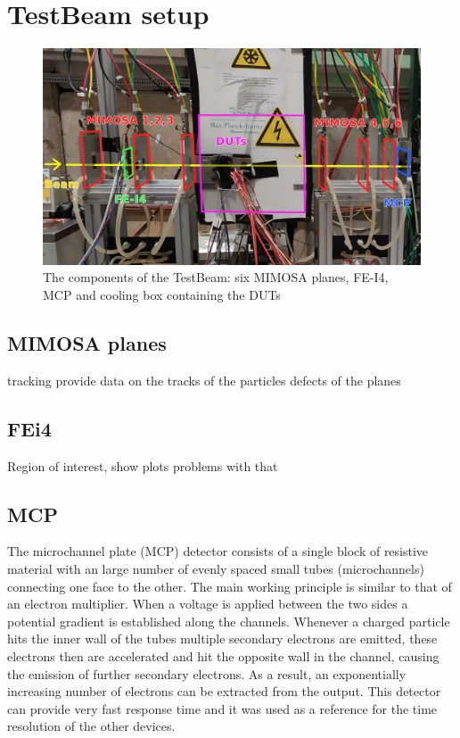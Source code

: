 \chapter{TestBeam setup}

\begin{figure}[!ht]
    \centering
    \includegraphics[width=.95\textwidth]{Images/TestBeam_setup/TestBeam_setup_redrawn.png}
    \caption{The components of the TestBeam: six MIMOSA planes, FE-I4, MCP and cooling box containing the DUTs}
    \label{fig:testbeam_setup}
\end{figure}
\section{MIMOSA planes}
tracking provide data on the tracks of the particles 
defects of the planes

\section{FEi4}
Region of interest, show plots
problems with that 

\section{MCP}\label{sec:MCP_description}
The microchannel plate (MCP) detector consists of a single block of resistive material with an large number of evenly spaced small tubes (microchannels) connecting one face to the other. The main working principle is similar to that of an electron multiplier. When a voltage is applied between the two sides a potential gradient is established along the channels. Whenever a charged particle hits the inner wall of the tubes multiple secondary electrons are emitted, these electrons then are accelerated and hit the opposite wall in the channel, causing the emission of further secondary electrons. As a result, an exponentially increasing number of electrons can be extracted from the output. This detector can provide very fast response time and it was used as a reference for the time resolution of the other devices.

